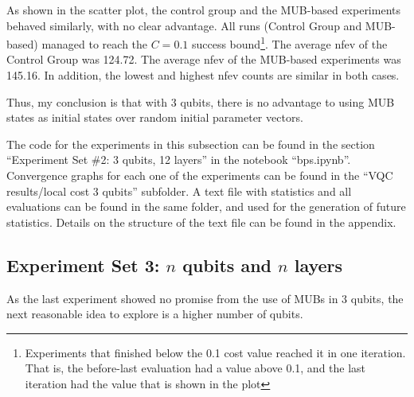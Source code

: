 \documentclass[a4paper,12pt]{article}
\begin{document}

As shown in the scatter plot, the control group and the MUB-based experiments behaved similarly, with no clear advantage.
All runs (Control Group and MUB-based) managed to reach the $C=0.1$ success bound\footnote{Experiments that finished below the 0.1 cost value reached it in one iteration. That is, the before-last evaluation had a value above 0.1, and the last iteration had the value that is shown in the plot}.
The average nfev of the Control Group was 124.72.
The average nfev of the MUB-based experiments was 145.16.
In addition, the lowest and highest nfev counts are similar in both cases.

Thus, my conclusion is that with 3 qubits, there is no advantage to using MUB states as initial states over random initial parameter vectors.

The code for the experiments in this subsection can be found in the section ``Experiment Set \#2: 3 qubits, 12 layers'' in the notebook ``bps.ipynb''.
Convergence graphs for each one of the experiments can be found in the ``VQC results/local cost 3 qubits'' subfolder. A text file with statistics and all evaluations can be found in the same folder, and used for the generation of future statistics. Details on the structure of the text file can be found in the appendix.



\subsection{Experiment Set 3: $n$ qubits and $n$ layers} \label{subsec:nqubits}
As the last experiment showed no promise from the use of MUBs in 3 qubits, the next reasonable idea to explore is a higher number of qubits.
\end{document}
